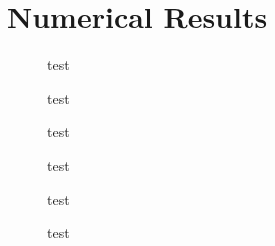 \section{Numerical Results}

\begin{figure}[h]
  \centering
  
  \caption{test}\label{fig:linf-error}
\end{figure}

\begin{figure}[h]
  \centering
  
  \caption{test}\label{fig:timings}
\end{figure}

\begin{figure}[h]
  \centering
  
  \caption{test}\label{fig:optL}
\end{figure}

\begin{figure}[h]
  \centering
  
  \caption{test}\label{fig:raddiff}
\end{figure}

\begin{figure}[h]
  \centering
  
  \caption{test}\label{fig:errorbound}
\end{figure}

\begin{figure}[h]
  \centering
  
  \caption{test}\label{fig:testfunc}
\end{figure}


